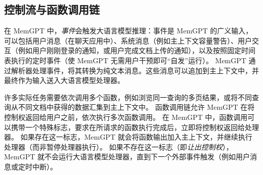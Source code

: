 \documentclass[UTF8,fontset=fandol,a4paper,11pt]{ctexart}
\newcommand{\ours}{MemGPT\xspace}
\begin{document}


\subsection{控制流与函数调用链}

在 \ours 中，\emph{事件}会触发大语言模型推理：事件是 \ours 的广义输入，可以包括用户消息（在聊天应用中）、系统消息（例如主上下文容量警告）、用户交互（例如用户刚刚登录的通知，或用户完成文档上传的通知），以及按照固定时间表执行的定时事件（使 \ours 无需用户干预即可“自发”运行）。
\ours 通过解析器处理事件，将其转换为纯文本消息。这些消息可以追加到主上下文中，并最终作为输入送入大语言模型处理器。

许多实际任务需要依次调用多个函数，例如浏览同一查询的多页结果，或将不同查询从不同文档中获得的数据汇集到主上下文中。
函数调用链允许 \ours 在将控制权返回给用户之前，依次执行多次函数调用。
在 \ours 中，函数调用可以携带一个特殊标志，要求在所请求的函数执行完成后，立即将控制权返回给处理器。
如果存在这一标志，\ours 就会将函数输出加入主上下文，并继续执行处理器（而非暂停处理器执行）。
如果不存在这一标志（即\emph{让出控制权}），\ours 就不会运行大语言模型处理器，直到下一个外部事件触发（例如用户消息或定时中断）。
\end{document}
